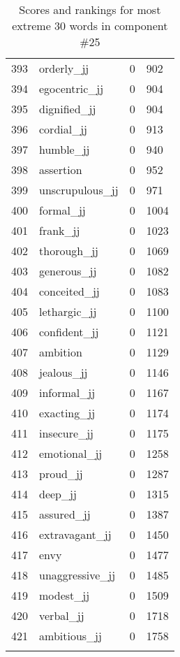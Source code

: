 \begin{longtable}[!htbp]{| rlr@{.}l |}
    393 & orderly\_jj & 0 & 902 \\
    394 & egocentric\_jj & 0 & 904 \\
    395 & dignified\_jj & 0 & 904 \\
    396 & cordial\_jj & 0 & 913 \\
    397 & humble\_jj & 0 & 940 \\
    398 & assertion & 0 & 952 \\
    399 & unscrupulous\_jj & 0 & 971 \\
    400 & formal\_jj & 0 & 1004 \\
    401 & frank\_jj & 0 & 1023 \\
    402 & thorough\_jj & 0 & 1069 \\
    403 & generous\_jj & 0 & 1082 \\
    404 & conceited\_jj & 0 & 1083 \\
    405 & lethargic\_jj & 0 & 1100 \\
    406 & confident\_jj & 0 & 1121 \\
    407 & ambition & 0 & 1129 \\
    408 & jealous\_jj & 0 & 1146 \\
    409 & informal\_jj & 0 & 1167 \\
    410 & exacting\_jj & 0 & 1174 \\
    411 & insecure\_jj & 0 & 1175 \\
    412 & emotional\_jj & 0 & 1258 \\
    413 & proud\_jj & 0 & 1287 \\
    414 & deep\_jj & 0 & 1315 \\
    415 & assured\_jj & 0 & 1387 \\
    416 & extravagant\_jj & 0 & 1450 \\
    417 & envy & 0 & 1477 \\
    418 & unaggressive\_jj & 0 & 1485 \\
    419 & modest\_jj & 0 & 1509 \\
    420 & verbal\_jj & 0 & 1718 \\
    421 & ambitious\_jj & 0 & 1758 \\
    \hline
    \caption{Scores and rankings for most extreme 30 words in component \#25} \\
\end{longtable}
